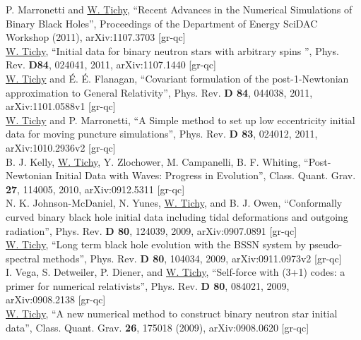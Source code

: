 P. Marronetti and \underline{W. Tichy},
``Recent Advances in the Numerical Simulations of Binary Black Holes'',
Proceedings of the Department of Energy SciDAC Workshop (2011),
arXiv:1107.3703 [gr-qc]
\\

\underline{W. Tichy},
``Initial data for binary neutron stars with arbitrary spins '',
Phys. Rev. {\bf D84}, 024041, 2011,
arXiv:1107.1440 [gr-qc] 
\\

\underline{W. Tichy} and \'E. \'E. Flanagan,
``Covariant formulation of the post-1-Newtonian approximation to General
Relativity'', Phys. Rev. {\bf D 84}, 044038, 2011,
arXiv:1101.0588v1 [gr-qc]
\\

\underline{W. Tichy} and P. Marronetti,
``A Simple method to set up low eccentricity initial data for moving
puncture simulations'', Phys. Rev. {\bf D 83}, 024012, 2011,
arXiv:1010.2936v2 [gr-qc]
\\

B. J. Kelly, \underline{W. Tichy}, Y. Zlochower, M. Campanelli, B. F. Whiting, 
``Post-Newtonian Initial Data with Waves: Progress in Evolution'',
Class. Quant. Grav. {\bf 27}, 114005, 2010,  arXiv:0912.5311 [gr-qc]
\\

N. K. Johnson-McDaniel, N. Yunes, \underline{W. Tichy}, and B. J. Owen,
``Conformally curved binary black hole initial data including tidal
deformations and outgoing radiation'',
Phys. Rev. {\bf D 80}, 124039, 2009, arXiv:0907.0891 [gr-qc]
\\

\underline{W. Tichy},
``Long term black hole evolution with the BSSN system
by pseudo-spectral methods'',
Phys. Rev. {\bf D 80}, 104034, 2009, arXiv:0911.0973v2 [gr-qc] 
\\

I. Vega, S. Detweiler, P. Diener, and \underline{W. Tichy},
``Self-force with (3+1) codes: a primer for numerical relativists'',
Phys. Rev. {\bf D 80}, 084021, 2009, arXiv:0908.2138 [gr-qc]
\\

\underline{W. Tichy},
``A new numerical method to construct binary neutron star initial data'',
Class. Quant. Grav. {\bf 26}, 175018 (2009), arXiv:0908.0620 [gr-qc]
\\

